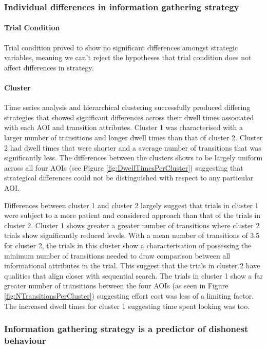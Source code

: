 \documentclass[man, floatsintext]{apa7}
\begin{document}
\subsubsection{Individual differences in information gathering strategy}

\paragraph{Trial Condition} 
Trial condition proved to show no significant differences amongst strategic variables,  meaning we can't reject the hypotheses that trial condition does not affect differences in strategy.   

\paragraph{Cluster}
Time series analysis and hierarchical clustering successfully produced differing strategies that showed significant differences across their dwell times associated with each AOI and transition attributes. Cluster 1 was characterised with a larger number of transitions and longer dwell times than that of cluster 2. Cluster 2 had dwell times that were shorter and a average number of transitions that was significantly less. The differences between the clusters shows to be largely uniform across all four AOIs (see Figure \ref{fig:DwellTimesPerCluster}) suggesting that strategical differences could not be distinguished with respect to any particular AOI. 

Differences between cluster 1 and cluster 2 largely suggest that trials in cluster 1 were subject to a more patient and considered approach than that of the trials in cluster 2. Cluster 1 shows greater a greater number of transitions where cluster 2 trials show significantly reduced levels. With a mean number of transitions of 3.5 for cluster 2, the trials in this cluster show a characterisation of possessing the minimum number of transitions needed to draw comparison between all informational attributes in the trial. This suggest that the trials in cluster 2 have qualities that align closer with sequential search. The trials in cluster 1 show a far greater number of transitions between the four AOIs (as seen in Figure \ref{fig:NTransitionsPerCluster}) suggesting effort cost was less of a limiting factor. The increased dwell times for cluster 1 suggesting time spent looking was too.

\subsubsection{Information gathering strategy is a predictor of dishonest behaviour}
\end{document}
